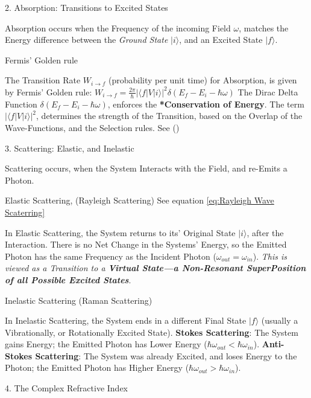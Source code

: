 \documentclass[a4paper, 10pt, onepage]{elegantbook}
\begin{document}
{    2. Absorption: Transitions to Excited States

\noindent

Absorption occurs when the Frequency of the incoming Field $\omega$, matches the Energy difference between the 
\emph{Ground State} $|i\rangle$,
and an Excited State $|f\rangle$.

     Fermis' Golden rule

\noindent

The Transition Rate $W_{i \to f}$ (probability per unit time) for Absorption, is given by Fermis' Golden rule:
$ W_{i \to f} = \frac{2\pi}{\hbar} |\langle f | V | i \rangle|^2 \delta(E_f - E_i - \hbar\omega) $
The Dirac Delta Function $\delta(E_f - E_i - \hbar\omega)$, enforces the \textbf{*Conservation of Energy}. The term 
$|\langle f | V | i \rangle|^2$, determines the strength of the Transition, based on the Overlap of the Wave-Functions, 
and the Selection rules. See (\pageref{para:Wignar-Eckart Theorem})

    3. Scattering: Elastic, and Inelastic

\noindent

Scattering occurs, when the System Interacts with the Field, and re-Emits a Photon.  

    Elastic Scattering, (Rayleigh Scattering) See equation \eqref{eq:Rayleigh Wave Scaterring}  

In Elastic Scattering, the System returns to its' Original State $|i\rangle$, after the Interaction. There is no Net 
Change in the Systems' Energy, so the Emitted Photon has the same Frequency as the Incident Photon ($\omega_{out} = 
\omega_{in}$).  
  \emph{This is viewed as a Transition to a \textbf{Virtual State—a Non-Resonant SuperPosition 
of all Possible Excited States}}.  

    Inelastic Scattering (Raman Scattering)  

\noindent

In Inelastic Scattering, the System ends in a different Final State $|f\rangle$ (usually a Vibrationally, or 
Rotationally Excited State).  
  \textbf{Stokes Scattering}: The System gains Energy; the Emitted Photon has Lower Energy ($\hbar\omega_{out} < 
\hbar\omega_{in}$).  
  \textbf{Anti-Stokes Scattering}: The System was already Excited, and loses Energy to the Photon; the Emitted Photon 
has Higher Energy ($\hbar\omega_{out} > \hbar\omega_{in}$).  

    4. The Complex Refractive Index  

}
\end{document}
